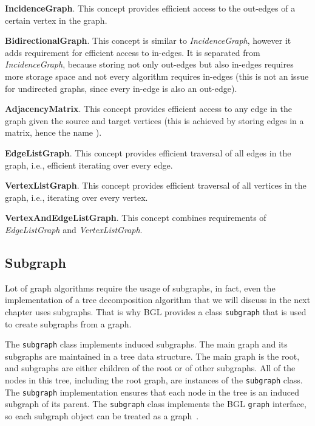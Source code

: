 \documentclass[thesis=B,english]{FITthesis}[2019/03/21]
\begin{document}
\noindent\textbf{IncidenceGraph}. This concept provides efficient access to the out-edges of a certain vertex in the graph.\bigskip

\noindent\textbf{BidirectionalGraph}. This concept is similar to \emph{IncidenceGraph}, however it adds requirement for efficient access to in-edges. It is separated from \emph{IncidenceGraph}, because storing not only out-edges but also in-edges requires more storage space and not every algorithm requires in-edges (this is not an issue for undirected graphs, since every in-edge is also an out-edge).\bigskip

\noindent\textbf{AdjacencyMatrix}. This concept provides efficient access to any edge in the graph given the source and target vertices (this is achieved by storing edges in a matrix, hence the name ).\bigskip

\noindent\textbf{EdgeListGraph}. This concept provides efficient traversal of all edges in the graph, i.e., efficient iterating over every edge.\bigskip

\noindent\textbf{VertexListGraph}. This concept provides efficient traversal of all vertices in the graph, i.e., iterating over every vertex.\bigskip

\noindent\textbf{VertexAndEdgeListGraph}. This concept combines requirements of \emph{EdgeListGraph} and \emph{VertexListGraph}.

\subsection{Subgraph}\label{ssec:subgraph}
Lot of graph algorithms require the usage of subgraphs, in fact, even the implementation of a tree decomposition algorithm that we will discuss in the next chapter uses subgraphs. That is why BGL provides a class \texttt{subgraph} that is used to create subgraphs from a graph.

The \texttt{subgraph} class implements induced subgraphs. The main graph and its subgraphs are maintained in a tree data structure. The main graph is the root, and subgraphs are either children of the root or of other subgraphs. All of the nodes in this tree, including the root graph, are instances of the \texttt{subgraph} class. The \texttt{subgraph} implementation ensures that each node in the tree is an induced subgraph of its parent. The \texttt{subgraph} class implements the BGL \texttt{graph} interface, so each subgraph object can be treated as a graph~\cite{boost_subgraph}.
\end{document}
